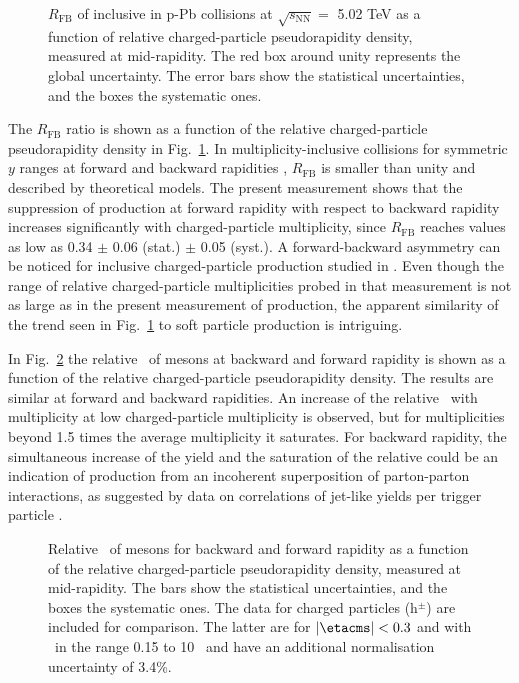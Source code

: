  \begin{figure}[htb]
  {\centering 
{} 
\par}
\caption{\label{fig:RFBvsMult}  $R_{\mathrm{FB}}$ of inclusive \jpsi in p-Pb collisions at $\sqrt{s_{\mathrm{NN}}} = $ 5.02 TeV as a function of relative charged-particle pseudorapidity density, measured at mid-rapidity. The red box around unity represents the global uncertainty.
The error bars show the statistical uncertainties, and the boxes the systematic ones.
}
\end{figure}

The $R_{\mathrm{FB}}$ ratio is shown as a function of the relative charged-particle pseudorapidity density in Fig.~\ref{fig:RFBvsMult}. In multiplicity-inclusive collisions 
for symmetric $y$ ranges at forward and backward rapidities \cite{Abelev:2014aa}, $R_{\mathrm{FB}}$ is smaller than unity and described by theoretical models. The present measurement shows that the suppression of \jpsi production at forward rapidity with respect to backward rapidity increases significantly with charged-particle multiplicity, since $R_{\mathrm{FB}}$ reaches values as low as 0.34 $\pm$ 0.06 (stat.) $\pm$ 0.05 (syst.). 
A forward-backward asymmetry can be noticed for inclusive charged-particle production studied in \cite{Adam:2015aa}. 
Even though the range of relative charged-particle multiplicities probed in that measurement is not as large as in the present measurement of \jpsi production, the apparent similarity of the trend seen in Fig.~\ref{fig:RFBvsMult} to soft particle production is intriguing.

In Fig.~\ref{fig:jpsimpt} the relative \mpt ~of \jpsi mesons at backward and forward rapidity is shown as a function of the relative charged-particle pseudorapidity density. The results are similar at forward and backward rapidities. An increase of the relative \mpt ~with multiplicity at low charged-particle multiplicity is observed, but for multiplicities beyond 1.5 times the average multiplicity it saturates.  For backward rapidity, the simultaneous increase of the yield and the saturation of the relative \mpt could be an indication of \jpsi production from an incoherent superposition of parton-parton interactions, as suggested by data on correlations of jet-like yields per trigger particle \cite{Abelev:2015aa}.

 \begin{figure}[htb]
  {\centering 
{}
\par}
\caption{\label{fig:jpsimpt} Relative \mpt ~of \jpsi mesons for backward and forward rapidity as a function of the relative charged-particle pseudorapidity density, measured at mid-rapidity. The bars show the statistical uncertainties, and the boxes the systematic ones. The data for charged particles (h$^\pm$) \cite{Abelev:2013aa} are included for comparison. The latter are for $|\etacms|<0.3$ and with \pt ~in the range 0.15 to 10 \gevc ~and have an additional normalisation uncertainty of 3.4\%.
}
\end{figure}

